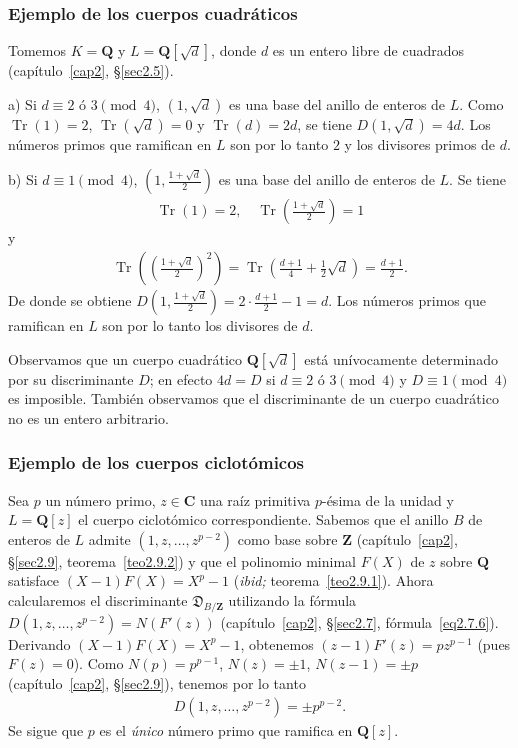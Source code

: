 \documentclass[10pt,oneside,bibtotoc,smallheadings,leqno,a5paper,DIV=12]{scrbook}
\newcommand{\QQ}{\mathbf{Q}}
\newcommand{\ZZ}{\mathbf{Z}}
\newcommand{\CC}{\mathbf{C}}
\newcommand{\disc}{\mathfrak{D}}
\DeclareMathOperator{\Tr}{Tr}
\numberwithin{equation}{section}
\theoremstyle{defi}
\theoremstyle{enonce}
\theoremstyle{rem}
\numberwithin{theorem}{section}
\numberwithin{proposition}{section}
\numberwithin{definition}{section}
\numberwithin{lemma}{section}
\numberwithin{corollary}{section}
\numberwithin{example}{section}
\numberwithin{footnote}{section}%
\begin{document}
\subsubsection*{Ejemplo de los cuerpos cuadr\'aticos}

Tomemos $K = \QQ$ y $L = \QQ[\sqrt{d}]$, donde $d$ es un entero libre de cuadrados (cap\'itulo~\ref{cap2},
\S\ref{sec2.5}).

a) Si $d\equiv 2\text{ \'o }3\pmod 4$, $(1,\sqrt{d})$ es una base del anillo de enteros de $L$. Como
$\Tr(1) = 2$, $\Tr(\sqrt{d}) = 0$ y $\Tr(d) = 2d$, se tiene $D(1,\sqrt{d}) = 4d$. Los n\'umeros primos
que ramifican en $L$ son por lo tanto $2$ y los divisores primos de $d$.

b) Si $d\equiv 1\pmod 4$, $\left(1,\frac{1+\sqrt{d}}{2}\right)$ es una base del anillo de enteros de $L$.
Se tiene
\begin{gather*}
\Tr(1) = 2,\quad\Tr\left(\frac{1+\sqrt{d}}{2}\right) = 1
\end{gather*}
y
\begin{gather*}
\Tr\left(\left(\frac{1+\sqrt{d}}{2}\right)^{2}\right) = \Tr\left(\frac{d+1}{4}+\frac{1}{2}\sqrt{d}\right)=\frac{d+1}{2}.
\end{gather*}
De donde se obtiene $D\left(1,\frac{1+\sqrt{d}}{2}\right) = 2\cdot\frac{d+1}{2}-1 = d$. Los n\'umeros primos
que ramifican en $L$ son por lo tanto los divisores de $d$.

Observamos que un cuerpo cuadr\'atico $\QQ[\sqrt{d}]$ est\'a un\'ivocamente determinado por su discriminante
$D$; en efecto $4d = D$ si $d\equiv 2\text{ \'o }3\pmod 4$ y $D\equiv 1\pmod 4$ es imposible. Tambi\'en
observamos que el discriminante de un cuerpo cuadr\'atico no es un entero arbitrario.

\subsubsection*{Ejemplo de los cuerpos ciclot\'omicos}

Sea $p$ un n\'umero primo, $z\in\CC$ una ra\'iz primitiva $p$-\'esima de la unidad y $L = \QQ[z]$
el cuerpo ciclot\'omico correspondiente. Sabemos que el anillo $B$ de enteros de $L$ admite $(1,z,\dots,z^{p-2})$
como base sobre $\ZZ$ (cap\'itulo~\ref{cap2}, \S\ref{sec2.9}, teorema~\ref{teo2.9.2})
y que el polinomio minimal $F(X)$ de $z$ sobre $\QQ$
satisface $(X-1)F(X) = X^{p}-1$ ({\em ibid;} teorema~\ref{teo2.9.1}). Ahora calcularemos el discriminante $\disc_{B/\ZZ}$ utilizando
la f\'ormula $D(1,z,\dots,z^{p-2}) = N(F'(z))$ (cap\'itulo~\ref{cap2}, \S\ref{sec2.7}, f\'ormula~\eqref{eq2.7.6}).
Derivando $(X-1)F(X) = X^{p}-1$, obtenemos $(z-1)F'(z) = pz^{p-1}$ (pues $F(z) = 0$). Como
$N(p)=p^{p-1}$, $N(z) = \pm 1$, $N(z-1)=\pm p$ (cap\'itulo~\ref{cap2}, \S\ref{sec2.9}), tenemos por lo tanto
\begin{gather}
D(1,z,\dots,z^{p-2})=\pm p^{p-2}.
\end{gather}
Se sigue que $p$ es el {\em \'unico} n\'umero primo que ramifica en $\QQ[z]$.
\end{document}
